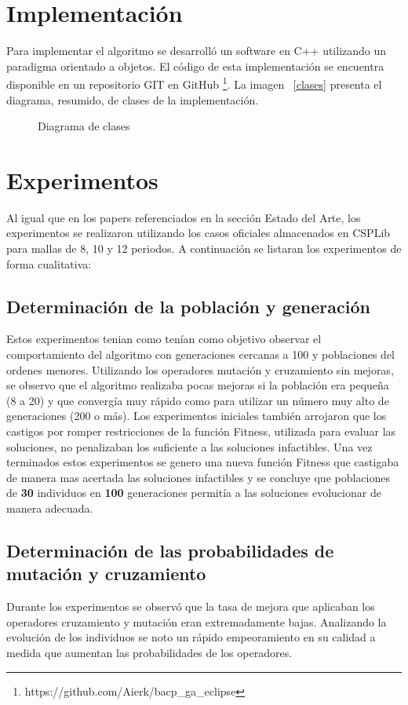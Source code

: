 \documentclass[letter, 10pt]{article}
\begin{document}
\section{Implementación}
Para implementar el algoritmo se desarrolló un software en C++ utilizando un
paradigma orientado a objetos. El código de esta implementación se encuentra
disponible en un repositorio GIT en
GitHub \footnote{https://github.com/Aierk/bacp\_ga\_eclipse}. La imagen
~\ref{clases} presenta el diagrama, resumido, de clases de la implementación.

\begin{figure}[h]
  \centering
  \caption{Diagrama de clases}
\end{figure}

\section{Experimentos}
\label{experimentos}
Al igual que en los papers referenciados en la sección Estado del Arte, los
experimentos se realizaron utilizando los casos oficiales almacenados en CSPLib
para mallas de 8, 10 y 12 periodos. A continuación se listaran los experimentos
de forma cualitativa:

\subsection{Determinación de la población y generación}
Estos experimentos tenian como tenían como objetivo observar el
comportamiento del algoritmo con generaciones cercanas a 100 y
poblaciones del ordenes menores.  Utilizando los operadores mutación y
cruzamiento sin mejoras, se observo que el algoritmo realizaba pocas
mejoras si la población era pequeña (8 a 20) y que convergía muy
rápido como para utilizar un número muy alto de generaciones (200 o
más). Los experimentos iniciales también arrojaron que los castigos
por romper restricciones de la función Fitness, utilizada para evaluar
las soluciones, no penalizaban los suficiente a las soluciones
infactibles. Una vez terminados estos experimentos se genero una nueva
función Fitness que castigaba de manera mas acertada las soluciones
infactibles y se concluye que poblaciones de \textbf{30} individuos en
\textbf{100} generaciones permitía a las soluciones evolucionar de manera
adecuada.

\subsection{Determinación de las probabilidades de mutación y cruzamiento}
Durante los experimentos se observó que la tasa de mejora que aplicaban los
operadores cruzamiento y mutación eran extremadamente bajas. Analizando la
evolución de los individuos se noto un rápido empeoramiento en su calidad a
medida que aumentan las probabilidades de los operadores.
\end{document}
